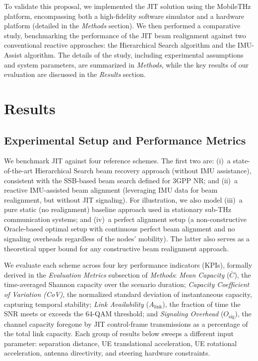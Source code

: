 \documentclass[fleqn,10pt]{wlscirep}
\newcommand{\rev}[1]{#1}
\begin{document}
To validate this proposal, we implemented the JIT solution using the MobileTHz platform, encompassing both a high-fidelity software simulator and a hardware platform (detailed in the \textit{Methods} section). We then performed a comparative study, benchmarking the performance of the JIT beam realignment against two conventional reactive approaches: the Hierarchical Search algorithm and the IMU-Assist algorithm. The details of the study, including experimental assumptions and system parameters, are summarized in \textit{Methods}, while the key results of our evaluation are discussed in the \textit{Results} section.



\section*{Results}

\rev{\subsection*{Experimental Setup and Performance Metrics}}

We benchmark JIT against four reference schemes. The first two are: (i)~a \rev{state-of-the-art Hierarchical Search beam recovery approach (without IMU assistance)\cite{photonics11060540}, consistent with the SSB-based beam search defined for 3GPP NR\cite{Giordani2018ATO, Heng2021SixChallenges}}; and (ii)~a reactive IMU-assisted beam alignment (leveraging IMU data for beam realignment, but without JIT signaling)\rev{\cite{s141019622, Brambilla_2019, 9391649}}. For illustration, we also model (iii)~a pure static (no realignment) baseline approach used in stationary sub-THz communication systems; and (iv)~a perfect alignment setup (a non-constructive Oracle-based optimal setup with continuous perfect beam alignment and no signaling overheads regardless of the nodes' mobility). The latter also serves as a theoretical upper bound for any constructive beam realignment approach.

We evaluate each scheme across four key performance indicators (KPIs), formally derived in the \textit{Evaluation Metrics} subsection of \textit{Methods}: \emph{Mean Capacity} ($\bar{C}$), the time-averaged Shannon capacity over the scenario duration; \emph{Capacity Coefficient of Variation (CoV)}, the normalized standard deviation of instantaneous capacity, capturing temporal stability; \emph{Link Availability} ($A_{\text{link}}$), the fraction of time the SNR meets or exceeds the 64-QAM threshold; and \emph{Signaling Overhead} ($O_{\text{sig}}$), the channel capacity foregone by JIT control-frame transmissions as a percentage of the total link capacity. Each group of results below sweeps a different input parameter: separation distance, UE translational acceleration, UE rotational acceleration, antenna directivity, and steering hardware constraints.
\end{document}
